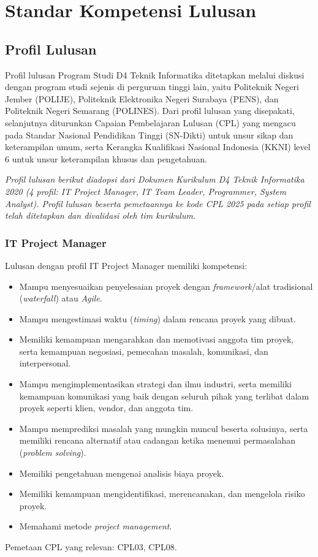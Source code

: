 \chapter{Standar Kompetensi Lulusan}

\section{Profil Lulusan}

Profil lulusan Program Studi D4 Teknik Informatika ditetapkan melalui diskusi dengan program studi sejenis di perguruan tinggi lain, yaitu Politeknik Negeri Jember (POLIJE), Politeknik Elektronika Negeri Surabaya (PENS), dan Politeknik Negeri Semarang (POLINES). Dari profil lulusan yang disepakati, selanjutnya diturunkan Capaian Pembelajaran Lulusan (CPL) yang mengacu pada Standar Nasional Pendidikan Tinggi (SN-Dikti) untuk unsur sikap dan keterampilan umum, serta Kerangka Kualifikasi Nasional Indonesia (KKNI) level 6 untuk unsur keterampilan khusus dan pengetahuan.

\textit{Profil lulusan berikut diadopsi dari Dokumen Kurikulum D4 Teknik Informatika 2020 (4 profil: IT Project Manager, IT Team Leader, Programmer, System Analyst). Profil lulusan beserta pemetaannya ke kode CPL 2025 pada setiap profil telah ditetapkan dan divalidasi oleh tim kurikulum.}

\subsection{IT Project Manager}

Lulusan dengan profil IT Project Manager memiliki kompetensi:
\begin{itemize}
\item Mampu menyesuaikan penyelesaian proyek dengan \textit{framework}/alat tradisional (\textit{waterfall}) atau \textit{Agile}.
\item Mampu mengestimasi waktu (\textit{timing}) dalam rencana proyek yang dibuat.
\item Memiliki kemampuan mengarahkan dan memotivasi anggota tim proyek, serta kemampuan negosiasi, pemecahan masalah, komunikasi, dan interpersonal.
\item Mampu mengimplementasikan strategi dan ilmu industri, serta memiliki kemampuan komunikasi yang baik dengan seluruh pihak yang terlibat dalam proyek seperti klien, vendor, dan anggota tim.
\item Mampu memprediksi masalah yang mungkin muncul beserta solusinya, serta memiliki rencana alternatif atau cadangan ketika menemui permasalahan (\textit{problem solving}).
\item Memiliki pengetahuan mengenai analisis biaya proyek.
\item Memiliki kemampuan mengidentifikasi, merencanakan, dan mengelola risiko proyek.
\item Memahami metode \textit{project management}.
\end{itemize}
Pemetaan CPL yang relevan: CPL03, CPL08.

